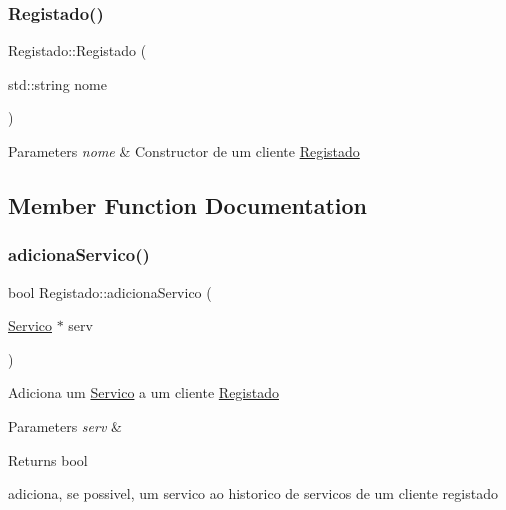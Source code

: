 \subsubsection{\texorpdfstring{Registado()}{Registado()}\hspace{0.1cm}{\footnotesize\ttfamily [3/3]}}
{\footnotesize\ttfamily Registado\+::\+Registado (\begin{DoxyParamCaption}\item[{std\+::string}]{nome }\end{DoxyParamCaption})}


\begin{DoxyParams}{Parameters}
{\em nome} & Constructor de um cliente \hyperlink{class_registado}{Registado} \\
\hline
\end{DoxyParams}


\subsection{Member Function Documentation}
\mbox{\label{class_registado_acc2088074502804017ff3e40022d966c}} 
\subsubsection{\texorpdfstring{adiciona\+Servico()}{adicionaServico()}}
{\footnotesize\ttfamily bool Registado\+::adiciona\+Servico (\begin{DoxyParamCaption}\item[{\hyperlink{class_servico}{Servico} $\ast$}]{serv }\end{DoxyParamCaption})}

Adiciona um \hyperlink{class_servico}{Servico} a um cliente \hyperlink{class_registado}{Registado}


\begin{DoxyParams}{Parameters}
{\em serv} & \\
\hline
\end{DoxyParams}
\begin{DoxyReturn}{Returns}
bool
\end{DoxyReturn}
adiciona, se possivel, um servico ao historico de servicos de um cliente registado \mbox{\label{class_registado_a304848f6ce1d82ad8438ec5e273cbc2d}} 
